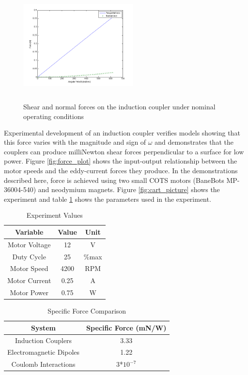 \begin{figure}
\includegraphics[width = 6cm, height = 6cm ]{figures/tan_v_norm_force.png}

\caption{Shear and normal forces on the induction coupler under nominal operating conditions}
\label{fig:tan_v_norm_f}
\end{figure}

Experimental development of an induction coupler verifies models showing that this force varies with the magnitude and sign of $\omega$ and demonstrates that the couplers can produce milliNewton shear forces perpendicular to a surface for low power. Figure \ref{fig:force_plot} shows the input-output relationship between the motor speeds and the eddy-current forces they produce. In the demonstrations described here, force is achieved using two small COTS motors (BaneBots MP-36004-540) and neodymium magnets. Figure \ref{fig:cart_picture} shows the experiment  and table \ref{tab:exp_vals} shows the parameters used in the experiment.

\begin{table}
\caption{\label{tab:exp_vals} Experiment Values}
\begin{ruledtabular}
\begin{tabular}{ccc}
Variable & Value & Unit \\
\hline
 Motor Voltage & 12 & V\\
 Duty Cycle & 25 & \%max\\
 Motor Speed & 4200 & RPM \\
 Motor Current & 0.25 & A \\
 Motor Power & 0.75 & W \\
\end{tabular}
\end{ruledtabular}
\end{table}

\begin{table}
\caption{\label{tab:eforce_comparison} Specific Force Comparison}
\begin{ruledtabular}
\begin{tabular}{cc}
System & Specific Force (mN/W) \\
\hline
 Induction Couplers & 3.33 \\
 Electromagnetic Dipoles & 1.22 \cite{Kong2004} \\
 Coulomb Interactions & 3*$10^{-7}$ \cite{king2002spacecraft}\\
\end{tabular}
\end{ruledtabular}
\end{table}


